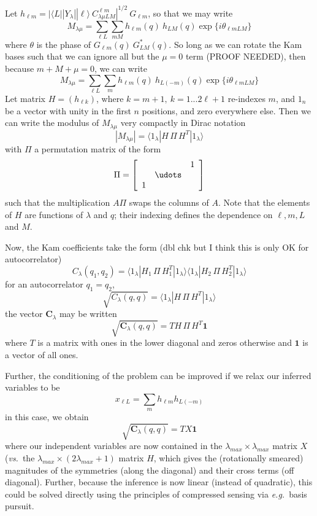 \documentclass[aps,prl,preprint,groupedaddress]{revtex4-1}
\def\*#1{\mathbf{#1}}
\begin{document}
Let $h_{\ell m} = | \langle L || Y_\lambda || \ell \rangle \> C^{\ell m}_{\lambda \mu LM} |^{1/2}  \> G_{\ell m}$, so that we may write
\[
M_{\lambda \mu} = \sum_{\ell L} \sum_{m M} h_{\ell m}(q) \> h_{L M} (q)
\exp \big\{ i \theta_{\ell m L M} \big\}
\]
where $\theta$ is the phase of $G_{\ell m}(q) \> G_{L M}^* (q)$. So long as we can rotate the Kam bases such that we can ignore all but the $\mu = 0$ term (PROOF NEEDED), then because $m + M + \mu = 0$, we can write
\[
M_{\lambda \mu} = \sum_{\ell L} \sum_{m} h_{\ell m}(q) \> h_{L (-m)} (q)
\exp \big\{ i \theta_{\ell m L M} \big\}
\]
Let matrix $H = (h_{\ell k})$, where $k = m + 1, \ k = 1... 2\ell+1$ re-indexes $m$, and $1_n$ be a vector with unity in the first $n$ positions, and zero everywhere else. Then we can write the modulus of $M_{\lambda \mu}$ very compactly in Dirac notation
\[
| M_{\lambda \mu} | = \langle 1_\lambda | H \, \Pi \, H^T | 1_\lambda \rangle 
\]
with $\Pi$ a permutation matrix of the form
\[
\Pi = \left[ \begin{array}{ccc}
 &  &  1\\
 & \udots  & \\
1 &  &  \\
\end{array} \right]
\]
such that the multiplication $A \Pi$ swaps the columns of $A$. Note that the elements of $H$ are functions of $\lambda$ and $q$; their indexing defines the dependence on $\ell, m, L$ and $M$.

Now, the Kam coefficients take the form (dbl chk but I think this is only OK for autocorrelator)
\[
C_\lambda (q_1, q_2) =
\langle 1_\lambda | H_1 \, \Pi \, H_1^T | 1_\lambda \rangle 
\langle 1_\lambda | H_2 \, \Pi \, H_2^T | 1_\lambda \rangle 
\]
for an autocorrelator $q_1 = q_2$,
\[
\sqrt{C_\lambda (q, q)} =
\langle 1_\lambda | H \, \Pi \, H^T  | 1_\lambda \rangle 
\]
the vector $\*C_\lambda$ may be written
\[
\sqrt{ \*C_\lambda (q,q) } = T H \, \Pi \, H^T \*1
\]
where $T$ is a matrix with ones in the lower diagonal and zeros otherwise and $\*1$ is a vector of all ones.

Further, the conditioning of the problem can be improved if we relax our inferred variables to be
\[
x_{\ell L} = \sum_m h_{\ell m} h_{L (-m)}
\]
in this case, we obtain
\[
\sqrt{ \*C_\lambda (q,q) } = T X \*1
\]
where our independent variables are now contained in the $\lambda_{max} \times \lambda_{max}$ matrix $X$ (\emph{vs.}~the $\lambda_{max} \times (2\lambda_{max} + 1)$ matrix $H$, which gives the (rotationally smeared) magnitudes of the symmetries (along the diagonal) and their cross terms (off diagonal). Further, because the inference is now linear (instead of quadratic), this could be solved directly using the principles of compressed sensing via \emph{e.g.}~basis pursuit.
\end{document}

